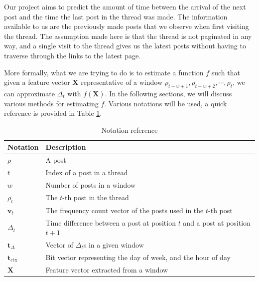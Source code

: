 \newcommand{\vocab}{\mathbf{v}}
\newcommand{\dtvec}{\mathbf{t}_\Delta}
\newcommand{\ctxvec}{\mathbf{t}_\text{ctx}}
\newcommand{\dt}{\Delta_t}
\newcommand{\prerror}{Pr_{error}}
\newcommand{\weights}{\mathbf{w}}
\newcommand{\X}{\mathbf{X}}
\newcommand{\post}{\rho}
\renewcommand{\t}{t}
\newcommand{\w}{w}
Our project aims to predict the amount of time between the arrival of the next 
post and the time the last post in the thread was made. The information 
available to us are the previously made posts that we observe when first 
visiting the thread. 
The assumption made here is that the thread is not 
paginated in any way, and a single visit to the thread gives us the latest posts 
without having to traverse through the links to the latest page.

More formally, what we are trying to do is to estimate a function $f$ such that 
given a feature vector $\X$ representative of a window $\post_{t - w + 
1},\post_{t - w + 2},\cdots ,\post_t$, we can approximate $\dt$ with $f(\X)$. In 
the following sections, we will discuss various methods for estimating $f$.  
Various notations will be used, a quick reference is provided in Table 
\ref{table:notations}.

\begin{table}
	\begin{center}
	\begin{tabular}{l l}
	\hline
Notation	&	Description\\
	\hline
$\post$		&	A post\\
$\t$		&	Index of a post in a thread\\
$\w$		&	Number of posts in a window\\
$\post_\t$	&	The $t$-th post in the thread\\
$\vocab_\t$	&	The frequency count vector of the posts used in the $t$-th 
	post\\
$\dt$		&	Time difference between a post at position $\t$ and a post at 
	position $\t+1$ \\
$\dtvec$	&	Vector of $\dt$s in a given window\\
$\ctxvec$	&	Bit vector representing the day of week, and the hour of day\\
$\X$		&	Feature vector extracted from a window\\
	\hline
	\end{tabular}
\end{center}
\caption{Notation reference} \label{table:notations}
\end{table}

